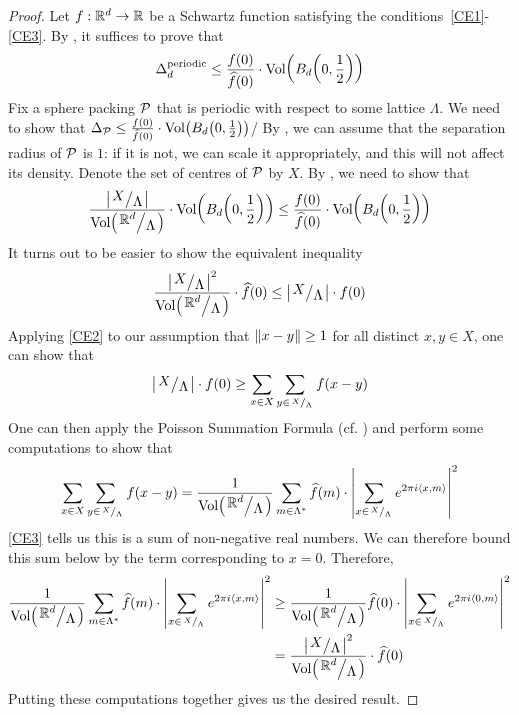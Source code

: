 \begin{proof}
    Let $f : \mathbb{R}^d \to \mathbb{R}$ be a Schwartz function satisfying the conditions~\ref{CE1}-\ref{CE3}. By , it suffices to prove that
    \begin{align*}
        \Delta_d^{\operatorname{periodic}} \leq \frac{f(0)}{\widehat{f}(0)} \cdot \operatorname{Vol}\!\left( B_d\!\left( 0, \frac{1}{2} \right) \right)
    \end{align*}
    Fix a sphere packing $\mathcal{P}$ that is periodic with respect to some lattice $\Lambda$. We need to show that $\Delta_{\mathcal{P}} \leq \frac{f(0)}{\widehat{f}(0)} \cdot \operatorname{Vol}\!\left( B_d\!\left( 0, \frac{1}{2} \right) \right)$/ By , we can assume that the separation radius of $\mathcal{P}$ is $1$: if it is not, we can scale it appropriately, and this will not affect its density. Denote the set of centres of $\mathcal{P}$ by $X$. By , we need to show that
    \begin{align*}
        \frac{\abs{\quotient{X}{\Lambda}}}{\Volof{\quotient{\R^d}{\Lambda}}} \cdot \Volof{B_d\of{0, \frac{1}{2}}} \leq \frac{f(0)}{\hat{f}(0)} \cdot \Volof{B_d\of{0, \frac{1}{2}}}
    \end{align*}
    It turns out to be easier to show the equivalent inequality
    \begin{align*}
        \frac{\abs{\quotient{X}{\Lambda}}^2}{\Volof{\quotient{\R^d}{\Lambda}}} \cdot \hat{f}(0) \leq \abs{\quotient{X}{\Lambda}} \cdot f(0)
    \end{align*}
    Applying \ref{CE2} to our assumption that $\left\lVert x - y \right\rVert \geq 1$ for all distinct $x, y \in X$, one can show that
    \begin{align*}
        \abs{\quotient{X}{\Lambda}} \cdot f(0) \geq \sum_{x \in X} \sum_{y \in {\tiny \quotient{X}{\Lambda}}} \fof{x - y}
    \end{align*}
    One can then apply the Poisson Summation Formula (cf. ) and perform some computations to show that
    \begin{align*}
        \sum_{x \in X} \sum_{y \in {\tiny \quotient{X}{\Lambda}}} \fof{x - y}
        =
        \frac{1}{\Volof{\quotient{\R^d}{\Lambda}}}\sum_{m \in \Lambda^*} \hat{f}(m) \cdot \abs{\sum_{x \in {\tiny \quotient{X}{\Lambda}}} e^{2 \pi i \cycl{x, m}}}^2
    \end{align*}
    \ref{CE3} tells us this is a sum of non-negative real numbers. We can therefore bound this sum below by the term corresponding to $x = 0$. Therefore,
    \begin{align*}
        \frac{1}{\Volof{\quotient{\R^d}{\Lambda}}}\sum_{m \in \Lambda^*} \hat{f}(m) \cdot \abs{\sum_{x \in {\tiny \quotient{X}{\Lambda}}} e^{2 \pi i \cycl{x, m}}}^2
        &\geq
        \frac{1}{\Volof{\quotient{\R^d}{\Lambda}}} \hat{f}(0) \cdot \abs{\sum_{x \in {\tiny \quotient{X}{\Lambda}}} e^{2 \pi i \cycl{0, m}}}^2 \\
        &= \frac{\abs{\quotient{X}{\Lambda}}^2}{\Volof{\quotient{\R^d}{\Lambda}}} \cdot \hat{f}(0)
    \end{align*}
    Putting these computations together gives us the desired result.
\end{proof}

